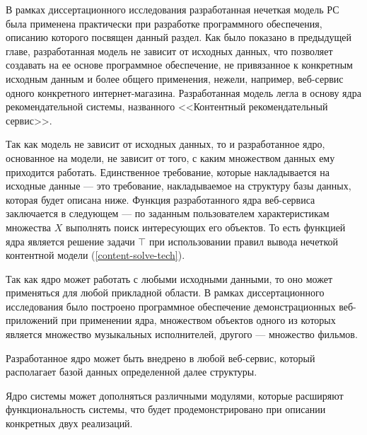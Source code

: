 В рамках диссертационного исследования разработанная нечеткая модель
РС была применена практически при разработке программного
обеспечения, описанию которого посвящен данный раздел.
Как было показано в предыдущей главе, разработанная модель не зависит от
исходных данных, что позволяет создавать на ее основе программное
обеспечение, не привязанное к конкретным исходным данным и
более общего применения, нежели, например, веб-сервис одного конкретного
интернет-магазина. Разработанная модель легла в основу
ядра рекомендательной системы, названного <<Контентный
рекомендательный сервис>>.

Так как модель не зависит от исходных данных, то и разработанное ядро,
основанное на модели, не зависит от того, с каким множеством данных ему приходится работать.
Единственное требование, которые накладывается на исходные данные ---
это требование, накладываемое на структуру базы данных, которая
будет описана ниже. Функция разработанного ядра веб-сервиса заключается
в следующем --- по заданным пользователем характеристикам множества $X$
выполнять поиск интересующих его объектов. То есть функцией ядра является
решение задачи $\top$ при использовании правил вывода нечеткой
контентной модели (\ref{content-solve-tech}).

Так как ядро может работать с любыми исходными данными, то оно может
применяться для любой прикладной области. В рамках диссертационного
исследования было построено программное обеспечение демонстрационных
веб-приложений при применении ядра, множеством объектов
одного из которых является множество музыкальных исполнителей,
другого --- множество фильмов.

Разработанное ядро может быть внедрено в любой веб-сервис, который располагает
базой данных определенной далее структуры.

Ядро системы может дополняться различными модулями, которые расширяют
функциональность системы, что будет продемонстрировано при описании конкретных
двух реализаций.

